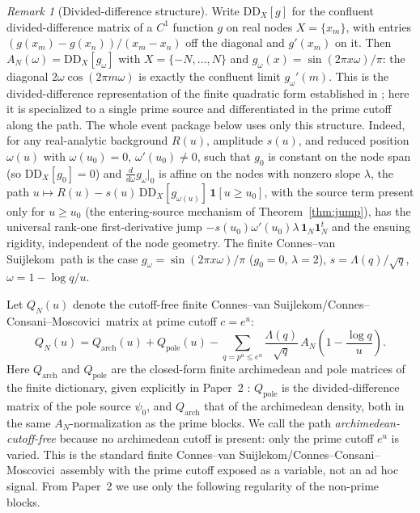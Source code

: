 \documentclass[11pt]{article}
\theoremstyle{plain}
\theoremstyle{definition}
\theoremstyle{remark}
\newtheorem{remark}[theorem]{Remark}
\newcommand{\cvs}{Connes--van Suijlekom}
\newcommand{\ccm}{Connes--Consani--Moscovici}
\newcommand{\one}{\mathbf 1}
\newcommand{\Lam}{\Lambda}
\begin{document}
\begin{remark}[Divided-difference structure]\label{rem:dd}
Write $\mathrm{DD}_X[g]$ for the confluent divided-difference matrix of a $C^1$
function $g$ on real nodes $X=\{x_m\}$, with entries
$(g(x_m)-g(x_n))/(x_m-x_n)$ off the diagonal and $g'(x_m)$ on it. Then
$A_N(\omega)=\mathrm{DD}_X[g_\omega]$ with $X=\{-N,\dots,N\}$ and
$g_\omega(x)=\sin(2\pi x\omega)/\pi$: the diagonal $2\omega\cos(2\pi m\omega)$ is
exactly the confluent limit $g_\omega'(m)$. This is the divided-difference
representation of the finite quadratic form established in
\cite[Props.~4.1--4.2]{ConnesvanSuijlekom2025}; here it is specialized to a
single prime source and differentiated in the prime cutoff along the path. The
whole event package below uses
only this structure. Indeed, for any real-analytic background $R(u)$, amplitude
$s(u)$, and reduced position $\omega(u)$ with $\omega(u_0)=0$,
$\omega'(u_0)\ne0$, such that $g_0$ is constant on the node span (so
$\mathrm{DD}_X[g_0]=0$) and $\tfrac{d}{d\omega}g_\omega|_0$ is affine on the nodes with
nonzero slope $\lambda$, the path
$u\mapsto R(u)-s(u)\,\mathrm{DD}_X[g_{\omega(u)}]\,\mathbf 1[u\ge u_0]$, with the
source term present only for $u\ge u_0$ (the entering-source mechanism of
Theorem~\ref{thm:jump}), has the
universal rank-one first-derivative jump $-s(u_0)\omega'(u_0)\lambda\,
\one_N\one_N^t$ and the ensuing rigidity, independent of the node geometry. The
finite \cvs\ path is the case $g_\omega=\sin(2\pi x\omega)/\pi$ ($g_0=0$,
$\lambda=2$),
$s=\Lam(q)/\sqrt q$, $\omega=1-\log q/u$.
\end{remark}

Let $Q_N(u)$ denote the cutoff-free finite \cvs/\ccm\ matrix at prime cutoff
$c=e^u$:
\[
        Q_N(u)=Q_{\mathrm{arch}}(u)+Q_{\mathrm{pole}}(u)
        -\sum_{q=p^a\le e^u}\frac{\Lam(q)}{\sqrt q}\,
             A_N\!\left(1-\frac{\log q}{u}\right).
\]
Here $Q_{\mathrm{arch}}$ and $Q_{\mathrm{pole}}$ are the closed-form finite
archimedean and pole matrices of the finite dictionary, given explicitly in
Paper~2 \cite[Lemma~2.1 and the displayed pole and archimedean
sources]{Groskin2026FiniteDictionary}:
$Q_{\mathrm{pole}}$ is the divided-difference matrix of the pole source
$\psi_0$, and $Q_{\mathrm{arch}}$ that of the archimedean density, both in the
same $A_N$-normalization as the prime blocks. We call the path
\emph{archimedean-cutoff-free} because no archimedean cutoff is present: only the
prime cutoff $e^u$ is varied. This is the standard finite \cvs/\ccm\ assembly
with the prime cutoff exposed as a variable, not an ad hoc signal. From Paper~2
we use only the following regularity of the non-prime blocks.
\end{document}
